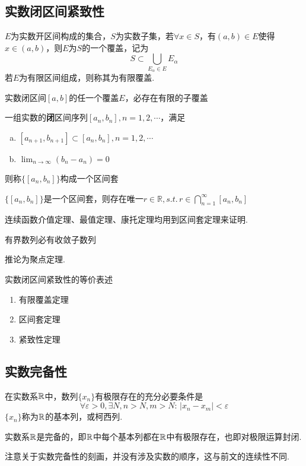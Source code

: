 \subsection{实数闭区间紧致性}
\begin{definition}[覆盖]
$E$为实数开区间构成的集合，$S$为实数子集，若$\forall x\in S$，有$(a,b)\in E$使得$x\in(a,b)$，则$E$为$S$的一个覆盖，记为
\[S\subset\bigcup_{E_\alpha\in E}E_\alpha\]
若$E$为有限区间组成，则称其为有限覆盖.
\end{definition}
\begin{theorem}
实数闭区间$[a,b]$的任一个覆盖$E$，必存在有限的子覆盖
\end{theorem}
\begin{definition}[区间套]
一组实数的\textbf{闭}区间序列$[a_n,b_n],n=1,2,\cdots$，满足
\begin{enumerate}[a.]
	\item $[a_{n+1},b_{n+1}]\subset[a_n,b_n],n=1,2,\cdots$
	\item $\displaystyle\lim_{n\to\infty}(b_n-a_n)=0$
\end{enumerate}
则称$\{[a_n,b_n]\}$构成一个区间套
\end{definition}
\begin{theorem}[区间套定理]
$\{[a_n,b_n]\}$是一个区间套，则存在唯一$\displaystyle r\in\mathbb{R},s.t.\,r\in\bigcap_{n=1}^{\infty}[a_n,b_n]$
\end{theorem}
\par 连续函数介值定理、最值定理、康托定理均用到区间套定理来证明.
\begin{theorem}
有界数列必有收敛子数列
\end{theorem}
\par 推论为聚点定理.
\par 实数闭区间紧致性的等价表述
\begin{enumerate}
	\itemsep -3pt
	\item 有限覆盖定理
	\item 区间套定理
	\item 紧致性定理
\end{enumerate}

\subsection{实数完备性}
\begin{theorem}
\label{thm:cauchy_convergence}
在实数系$\mathbb{R}$中，数列$\{x_n\}$有极限存在的充分必要条件是
\[\forall\varepsilon>0,\exists N,n>N,m>N:\,|x_n-x_m|<\varepsilon\]
$\{x_n\}$称为$\mathbb{R}$的基本列，或柯西列.
\end{theorem}
\begin{theorem}
实数系$\mathbb{R}$是完备的，即$\mathbb{R}$中每个基本列都在$\mathbb{R}$中有极限存在，也即对极限运算封闭.
\end{theorem}
注意关于实数完备性的刻画，并没有涉及实数的顺序，这与前文的连续性不同.